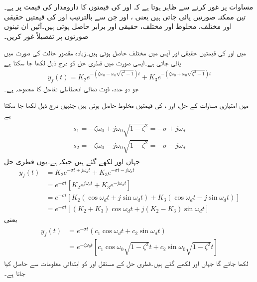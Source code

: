 مساوات  پر غور کرنے سے ظاہر ہوتا ہے کہ  اور  کی قیمتوں کا دارومدار  کی قیمت پر ہے۔تین ممکنہ صورتیں پائی جاتی ہیں یعنی ،  اور  جن سے بالترتیب  اور  کی قیمتیں حقیقی اور مختلف، مخلوط اور مختلف، حقیقی اور برابر حاصل ہوتی ہیں۔آئیں ان تینوں صورتوں پر تفصیلاً غور کریں۔

 میں  اور  کی قیمتیں حقیقی اور آپس میں مختلف حاصل ہوتی ہیں۔زیادہ مقصور حالت  کی صورت میں پائی جاتی ہے۔ایسی صورت میں فطری حل کو درج ذیل لکھا جا سکتا ہے
\begin{align}\label{مساوات_عارضی_فطری_زیادہ_مقصور_حل}
y_f(t)=K_2 e^{-(\zeta\omega_0- \omega_0\sqrt{\zeta^2-1})t}+K_3 e^{-(\zeta\omega_0+ \omega_0\sqrt{\zeta^2-1})t}
\end{align}
جو دو عدد، قوت نمائی انحطاطی تفاعل  کا مجموعہ ہے۔

   میں امتیازی مساوات کے حل،  اور ،  کی قیمتیں مخلوط حاصل ہوتی ہیں جنہیں درج ذیل لکھا جا سکتا ہے
\begin{gather}
\begin{aligned}
s_1=-\zeta\omega_0+ j\omega_0\sqrt{1-\zeta^2}=-\sigma+j \omega_d\\
s_2=-\zeta\omega_0- j\omega_0\sqrt{1-\zeta^2}=-\sigma-j\omega_d
\end{aligned}
\end{gather}
جہاں  اور  لکھے گئے ہیں جبکہ  ہے۔یوں فطری حل
\begin{align*}
y_f(t)&=K_2e^{-\sigma t+j\omega_d t}+K_3e^{-\sigma t -j \omega_d t}\\
&=e^{-\sigma t} \left[K_2 e^{j \omega_d t}+K_3 e^{-j \omega_d t}\right]\\
&=e^{-\sigma t} \left[K_2(\cos \omega_d t + j \sin \omega_d t)+K_3(\cos \omega_d t -j \sin \omega_d t)\right]\\
&=e^{-\sigma t} \left[(K_2+K_3)\cos \omega_d t+j(K_2-K_3)\sin \omega_d t\right]
\end{align*}
یعنی
\begin{gather}
\begin{aligned}\label{مساوات_عارضی_فطری_حل_کم_تقصیر_الف}
y_f(t)&=e^{-\sigma t} \left(c_1 \cos \omega_d t +c_2 \sin \omega_d t\right)\\
&=e^{-\zeta\omega_0 t}\left[c_1 \cos \omega_0\sqrt{1-\zeta^2} t+c_2 \sin \omega_0 \sqrt{1-\zeta^2} t\right]
\end{aligned}
\end{gather}
لکھا جائے گا جہاں  اور  لکھے گئے ہیں۔فطری حل کے مستقل  اور  کو ابتدائی معلومات سے حاصل کیا جاتا ہے۔

